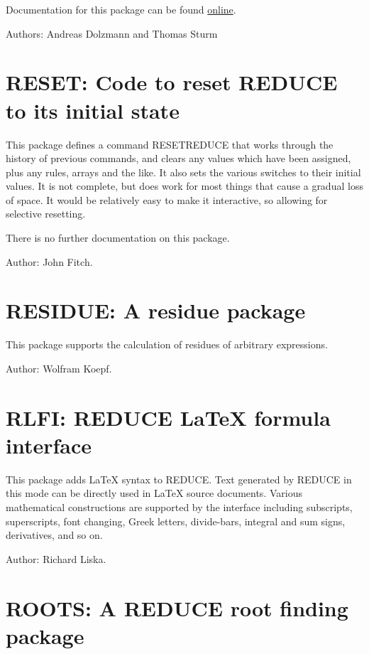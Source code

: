 Documentation for this package can be found \href{http://redlog.eu/}{online}.

Authors: Andreas Dolzmann and Thomas Sturm

\section{RESET: Code to reset REDUCE to its initial state} 

This package defines a command RESETREDUCE that works through the
history of previous commands, and clears any values which have been
assigned, plus any rules, arrays and the like.  It also sets the various
switches to their initial values.  It is not complete, but does work for
most things that cause a gradual loss of space.  It would be relatively
easy to make it interactive, so allowing for selective resetting.

There is no further documentation on this package.

Author: John Fitch.

\newpage

\section{RESIDUE: A residue package} 

This package supports the calculation of residues of arbitrary
expressions.

Author: Wolfram Koepf.



\newpage

\section{RLFI: REDUCE \LaTeX{} formula interface} 

This package adds \LaTeX{} syntax to REDUCE.  Text generated by REDUCE in
this mode can be directly used in \LaTeX{} source documents.  Various
mathematical constructions are supported by the interface including
subscripts, superscripts, font changing, Greek letters, divide-bars,
integral and sum signs, derivatives, and so on.

Author: Richard Liska.


\newpage

\section{ROOTS: A REDUCE root finding package} 

